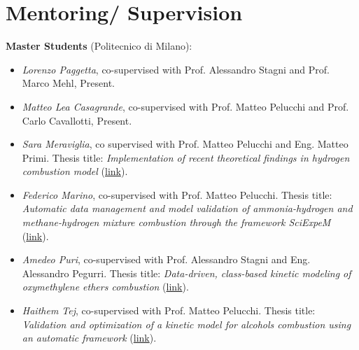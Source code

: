 \section{\sc Mentoring/ Supervision}

\textbf{Master Students} (Politecnico di Milano):

\begin{itemize}
    \item [ ] \textit{Lorenzo Paggetta}, co-supervised with Prof. Alessandro Stagni and Prof.
       Marco Mehl, Present.
    \item [ ] \textit{Matteo Lea Casagrande}, co-supervised with Prof. Matteo Pelucchi and Prof.
       Carlo Cavallotti, Present.
    \item [ ] \textit{Sara Meraviglia}, co supervised with Prof. Matteo Pelucchi and Eng. Matteo
       Primi. Thesis title: \textit{Implementation of recent theoretical findings in
       hydrogen combustion model} (\href{https://hdl.handle.net/10589/214934}{link}).
    \item [ ] \textit{Federico Marino}, co-supervised with Prof. Matteo Pelucchi. Thesis title:
       \textit{Automatic data management and model validation of ammonia-hydrogen and
       methane-hydrogen mixture combustion through the framework SciExpeM}
       (\href{https://hdl.handle.net/10589/212616}{link}).
    \item [ ] \textit{Amedeo Puri}, co-supervised with Prof. Alessandro Stagni and Eng.
       Alessandro Pegurri. Thesis title: \textit{Data-driven, class-based kinetic modeling
       of oxymethylene ethers combustion}
       (\href{https://hdl.handle.net/10589/206686}{link}).
    \item [ ] \textit{Haithem Tej}, co-supervised with Prof. Matteo Pelucchi. Thesis title:
       \textit{Validation and optimization of a kinetic model for alcohols combustion
       using an automatic framework} (\href{https://hdl.handle.net/10589/210401}{link}).
\end{itemize}
